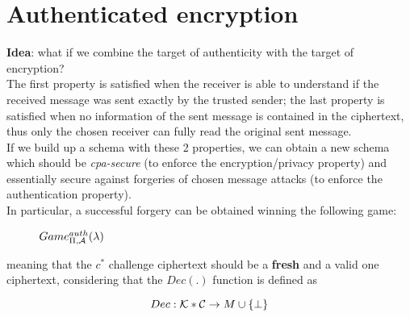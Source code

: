 \section{Authenticated encryption}
\textbf{Idea}: what if we combine the target of authenticity with the
target of encryption?\\
The first property is satisfied when the receiver is able to understand if the
received message was sent exactly by the trusted sender; the last property is
satisfied when no information of the sent message is contained in the ciphertext,
thus only the chosen receiver can fully read the original sent message.\\
If we build up a schema with these 2 properties, we can obtain a new schema
which should be \textit{cpa-secure} (to enforce the encryption/privacy property)
and essentially secure against forgeries of chosen message attacks (to enforce
the authentication property).\\
In particular, a successful forgery can be obtained winning the following game:

\begin{figure}[h!]
   \centering
   \sdinit{}
   \caption{$Game _{\Pi, \mathcal{A}}^{auth}(\lambda)$}
\end{figure}

meaning that the $c^{*}$ challenge ciphertext should be a \textbf{fresh} and a
valid one ciphertext, considering
that the $Dec(.)$ function is defined as

\begin{equation*}
    Dec:\mathcal{K}*\mathcal{C} \to M \cup \{\perp\}
\end{equation*}

